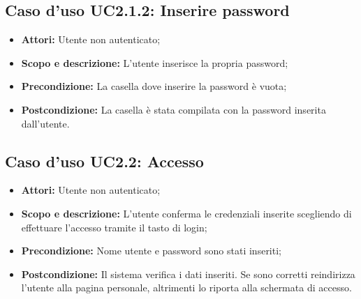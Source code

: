 \subsection{Caso d'uso UC2.1.2: Inserire password}
\begin{itemize}
	\item \textbf{Attori:} Utente non autenticato;
	\item \textbf{Scopo e descrizione:} L'utente inserisce la propria password;
	\item \textbf{Precondizione:} La casella dove inserire la password è vuota;
	\item \textbf{Postcondizione:} La casella è stata compilata con la password inserita dall'utente.
\end{itemize}

\subsection{Caso d'uso UC2.2: Accesso}
\begin{itemize}
	\item \textbf{Attori:} Utente non autenticato;
	\item \textbf{Scopo e descrizione:} L'utente conferma le credenziali inserite scegliendo di effettuare l'accesso tramite il tasto di login;
	\item \textbf{Precondizione:} Nome utente e password sono stati inseriti;
	\item \textbf{Postcondizione:} Il sistema verifica i dati inseriti. Se sono corretti reindirizza l'utente alla pagina personale, altrimenti lo riporta alla schermata di accesso.
\end{itemize}

